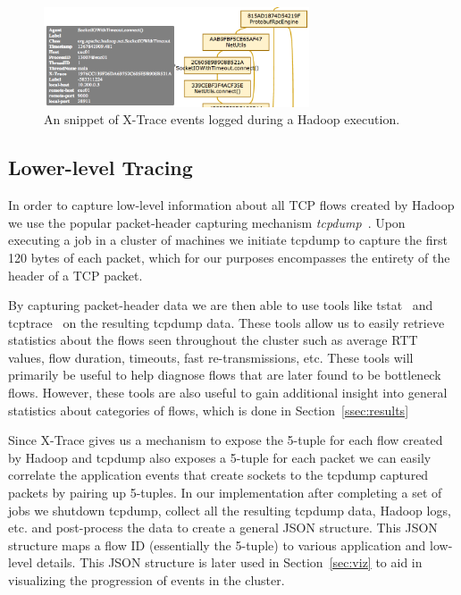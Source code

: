 \begin{figure}
\centering
\includegraphics[width=0.7\textwidth]{figures/xtrace-example2.png}
\caption{An snippet of X-Trace events logged during a Hadoop execution.}
\label{fig:xtrace}
\end{figure}

\subsection{Lower-level Tracing}
\label{ssec:low}
In order to capture low-level information about all TCP flows created by Hadoop 
we use the popular packet-header capturing mechanism \emph{tcpdump}~\cite{tcpdump}.
Upon executing a job in a cluster of machines we initiate tcpdump to capture the 
first 120 bytes of each packet, which for our purposes encompasses the entirety of 
the header of a TCP packet. 

By capturing packet-header data we are then able to use tools like tstat~\cite{tstat}
and tcptrace~\cite{tcptrace} on the resulting tcpdump data. These tools allow us to 
easily retrieve statistics about the flows seen throughout the cluster such as 
average RTT values, flow duration, timeouts, fast re-transmissions, etc. These tools
will primarily be useful to help diagnose flows that are later found to be bottleneck
flows. However, these tools are also useful to gain additional insight into general 
statistics about categories of flows, which is done in Section~\ref{ssec:results}

Since X-Trace gives us a mechanism to expose the 5-tuple for each flow created by 
Hadoop and tcpdump also exposes a 5-tuple for each packet we can easily correlate
the application events that create sockets to the tcpdump captured packets by 
pairing up 5-tuples. In our implementation after completing a set of jobs we 
shutdown tcpdump, collect all the resulting tcpdump data, Hadoop logs, etc. and 
post-process the data to create a general JSON structure. This JSON structure maps
a flow ID (essentially the 5-tuple) to various application and low-level details. 
This JSON structure is later used in Section~\ref{sec:viz} to aid in visualizing the 
progression of events in the cluster.

